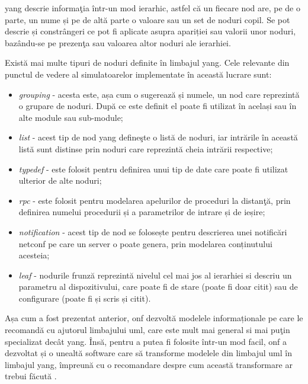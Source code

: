 \gls{yang} descrie informaţia într-un mod ierarhic, astfel că un fiecare nod are, pe de o parte, un nume și pe de altă parte o valoare sau un set de noduri copil. Se pot descrie și constrângeri ce pot fi aplicate asupra apariției sau valorii unor noduri, bazându-se pe prezenţa sau valoarea altor noduri ale ierarhiei.

Există mai multe tipuri de noduri definite în limbajul \gls{yang}. Cele relevante din punctul de vedere al simulatoarelor implementate în această lucrare sunt:

\begin{itemize}
	\item \textit{grouping} - acesta este, așa cum o sugerează și numele, un nod care reprezintă o grupare de noduri. După ce este definit el poate fi utilizat în același sau în alte module sau sub-module;
	\item \textit{list} - acest tip de nod \gls{yang} defineşte o listă de noduri, iar intrările în această listă sunt distinse prin noduri care reprezintă cheia intrării respective;
	\item \textit{typedef} - este folosit pentru definirea unui tip de date care poate fi utilizat ulterior de alte noduri;
	\item \textit{rpc} - este folosit pentru modelarea apelurilor de proceduri la distanţă, prin definirea numelui procedurii și a parametrilor de intrare și de ieșire;
	\item \textit{notification} - acest tip de nod se folosește pentru descrierea unei notificări \gls{netconf} pe care un server o poate genera, prin modelarea conținutului acesteia;
	\item \textit{leaf} - nodurile frunză reprezintă nivelul cel mai jos al ierarhiei si descriu un parametru al dispozitivului, care poate fi de stare (poate fi doar citit) sau de configurare (poate fi și scris și citit).
\end{itemize}

Așa cum a fost prezentat anterior, \gls{onf} dezvoltă modelele informaționale pe care le recomandă cu ajutorul limbajului \gls{uml}, care este mult mai general si mai puţin specializat decât \gls{yang}. Însă, pentru a putea fi folosite într-un mod facil, \gls{onf} a dezvoltat și o unealtă software care să transforme modelele din limbajul \gls{uml} în limbajul \gls{yang}, împreună cu o recomandare despre cum această transformare ar trebui făcută \cite{onftr531}.